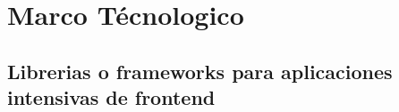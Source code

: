\section{Marco Técnologico}




\subsection{Librerias o frameworks para aplicaciones intensivas de frontend }
    
